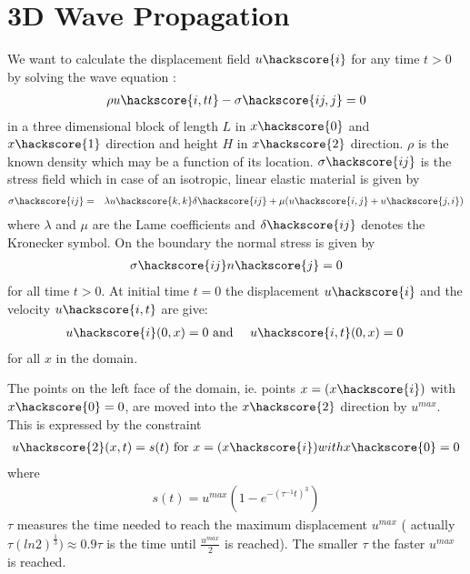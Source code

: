 \chapter{3D Wave Propagation}
\label{WAVE CHAP}

We want to calculate the displacement field $u\hackscore{i}$ for any time $t>0$ by solving the wave equation
:
\begin{eqnarray}\label{WAVE general problem}
\rho u\hackscore{i,tt} - \sigma\hackscore{ij,j}=0
\end{eqnarray}
in a three dimensional block of length $L$ in $x\hackscore{0}$
and $x\hackscore{1}$ direction and height $H$
in $x\hackscore{2}$ direction. $\rho$ is the known density which may be a function of its location.
$\sigma\hackscore{ij}$ is the stress field  which in case of an isotropic, linear elastic material is given by
\begin{eqnarray} \label{WAVE stress}
\sigma\hackscore{ij} & = & \lambda u\hackscore{k,k} \delta\hackscore{ij} + \mu ( u\hackscore{i,j} + u\hackscore{j,i})
\end{eqnarray}
where $\lambda$ and $\mu$ are the Lame coefficients 
 and $\delta\hackscore{ij}$ denotes the Kronecker symbol.
On the boundary the normal stress is given by
\begin{eqnarray} \label{WAVE natural}
\sigma\hackscore{ij}n\hackscore{j}=0
\end{eqnarray}
for all time $t>0$. At initial time $t=0$ the displacement 
$u\hackscore{i}$ and the velocity $u\hackscore{i,t}$ are give:
\begin{eqnarray} \label{WAVE initial}
u\hackscore{i}(0,x)=0 & \mbox{ and } & u\hackscore{i,t}(0,x)=0 \; 
\end{eqnarray}
for all $x$ in the domain. 

The points on the left face of the domain, ie. points $x=(x\hackscore{i})$ with $x\hackscore{0}=0$,
are moved into the $x\hackscore{2}$ direction by $u^{max}$. This is expressed by the constraint
\begin{eqnarray} \label{WAVE impact}
u\hackscore{2}(x,t)=s(t) \mbox{ for } x=(x\hackscore{i}) with  x\hackscore{0}=0 
\end{eqnarray}
where
\begin{eqnarray} \label{WAVE impact s}
s(t)=u^{max} (1-e^{-(\tau^{-1}t)^3})
\end{eqnarray}
$\tau$ measures the time needed to reach the maximum displacement $u^{max}$ (
actually $\tau (ln 2)^{\frac{1}{3}}) \approx 0.9 \tau$ is the time until $\frac{u^{max}}{2}$ is reached).
The smaller $\tau$ the faster $u^{max}$ is reached.

